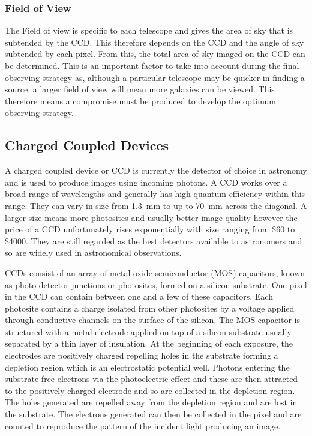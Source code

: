 		\subsubsection{Field of View} %
		\label{ssub:field_of_view}
			The Field of view is specific to each telescope and gives the area of sky that is subtended by the CCD. This therefore depends on the CCD and the angle of sky subtended by each pixel. From this, the total area of sky imaged on the CCD can be determined. This is an important factor to take into account during the final observing strategy as, although a particular telescope may be quicker in finding a source, a larger field of view will mean more galaxies can be viewed. This therefore means a compromise must be produced to develop the optimum observing strategy.

	\subsection{Charged Coupled Devices} %
	\label{sub:charged_coupled_devices}
		A charged coupled device or CCD is currently the detector of choice in astronomy and is used to produce images using incoming photons. A CCD works over a broad range of wavelengths and generally has high quantum efficiency within this range. They can vary in size from \SI{1.3}{\milli\metre} to up to \SI{70}{\milli\metre} across the diagonal. A larger size means more photosites and usually better image quality however the price of a CCD unfortunately rises exponentially with size ranging from \$60 to \$4000. They are still regarded as the best detectors available to astronomers and so are widely used in astronomical observations.

		CCDs consist of an array of metal-oxide semiconductor (MOS) capacitors, known as photo-detector junctions or photosites, formed on a silicon substrate. One pixel in the CCD can contain between one and a few of these capacitors. Each photosite contains a charge isolated from other photosites by a voltage applied through conductive channels on the surface of the silicon\cite{Diffraction_Limited_Imaging_Saha}. The MOS capacitor is structured with a metal electrode applied on top of a silicon substrate usually separated by a thin layer of insulation. At the beginning of each exposure, the electrodes are positively charged repelling holes in the substrate forming a depletion region which is an electrostatic potential well. Photons entering the substrate free electrons via the photoelectric effect and these are then attracted to the positively charged electrode and so are collected in the depletion region. The holes generated are repelled away from the depletion region and are lost in the substrate. The electrons generated can then be collected in the pixel and are counted to reproduce the pattern of the incident light producing an image.

